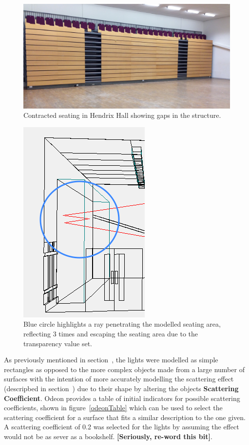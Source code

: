 \documentclass[../../main.tex]{subfiles}
\begin{document}
			\begin{figure}[H]
				\centerline{\includegraphics[scale = 0.12]{Sections/Implementation/Odeon/images/seating.jpg}}
				\caption{Contracted seating in Hendrix Hall showing gaps in the structure.}
				\label{seating}
			\end{figure}

			\begin{figure}[H]
				\center\includegraphics[scale = 0.7]{Sections/Implementation/Odeon/images/OdeonRays/transparencyEdit/singleRay2_edit3.PNG}
				\caption{Blue circle highlights a ray penetrating the modelled seating area, reflecting 3 times and escaping the seating area due to the transparency value set.}
				\label{transparency}
			\end{figure}

			As previously mentioned in section~, the lights were modelled as simple rectangles as opposed to the more complex objects made from a large number of surfaces with the intention of more accurately modelling the scattering effect (descripbed in section~) due to their shape by altering the objects \textbf{Scattering Coefficient}. Odeon provides a table of initial indicators for possible scattering coefficients, shown in figure~\ref{odeonTable} which can be used to select the scattering coefficient for a surface that fits a similar description to the one given. A scattering coefficient of 0.2 was selected for the lights by assuming the effect would not be as sever as a bookshelf. \textbf{[Seriously, re-word this bit]}.
\end{document}
